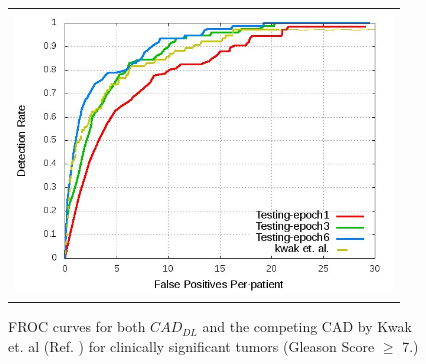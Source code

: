 \begin{figure} [ht]
   \begin{center}
   \begin{tabular}{c}
   \includegraphics[height=7.5cm]{Figure7}
   \end{tabular}
   \end{center}
   \caption[Fig7]
   { \label{fig:7} 
   FROC curves for both $CAD_{DL}$ and the competing CAD by Kwak et. al (Ref. ) for clinically significant tumors (Gleason Score $\geq$ 7.)}
   \end{figure}

